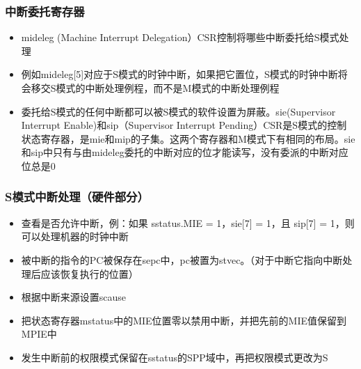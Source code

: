 \begin{frame}[fragile]
    \frametitle{中断委托寄存器}
    \begin{itemize}
        \item mideleg (Machine Interrupt Delegation）CSR控制将哪些中断委托给S模式处理
        \item 例如mideleg[5]对应于S模式的时钟中断，如果把它置位，S模式的时钟中断将会移交S模式的中断处理例程，而不是M模式的中断处理例程
        \item 委托给S模式的任何中断都可以被S模式的软件设置为屏蔽。sie(Supervisor Interrupt Enable)和sip（Supervisor Interrupt Pending）CSR是S模式的控制状态寄存器，是mie和mip的子集。这两个寄存器和M模式下有相同的布局。sie和sip中只有与由mideleg委托的中断对应的位才能读写，没有委派的中断对应位总是0
    \end{itemize}
\end{frame}

\begin{frame}[fragile]
    \frametitle{S模式中断处理（硬件部分）}
    \begin{itemize}
        \item 查看是否允许中断，例：如果 sstatus.MIE = 1，sie[7] = 1，且 sip[7] = 1，则可以处理机器的时钟中断
        \item 被中断的指令的PC被保存在sepc中，pc被置为stvec。（对于中断它指向中断处理后应该恢复执行的位置）
        \item 根据中断来源设置scause
        \item 把状态寄存器mstatus中的MIE位置零以禁用中断，并把先前的MIE值保留到MPIE中
        \item 发生中断前的权限模式保留在sstatus的SPP域中，再把权限模式更改为S
    \end{itemize}
\end{frame}

